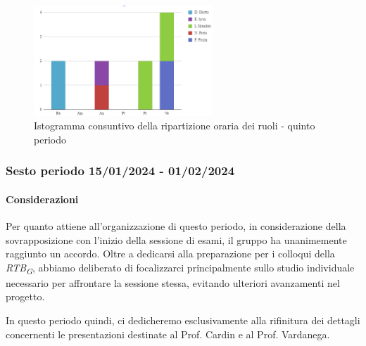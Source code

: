 \begin{figure}[H]
    \centering
    \includegraphics[width=0.6\textwidth]{../Images/consuntivoDivisioneRuoli5Periodo.png}
    \caption{Istogramma consuntivo della ripartizione oraria dei ruoli - quinto periodo}
    \label{fig:Consuntivo_ripartizione_oraria_5}
\end{figure}


\subsubsection{Sesto periodo  15/01/2024 - 01/02/2024}
\paragraph{Considerazioni}
Per quanto attiene all'organizzazione di questo periodo, in considerazione della sovrapposizione con l'inizio della sessione di esami, il gruppo ha unanimemente raggiunto un accordo. Oltre a dedicarsi alla preparazione per i colloqui della \textit{RTB}\textsubscript{\textit{G}}, abbiamo deliberato di focalizzarci principalmente sullo studio individuale necessario per affrontare la sessione stessa, evitando ulteriori avanzamenti nel progetto.

In questo periodo quindi, ci dedicheremo esclusivamente alla rifinitura dei dettagli concernenti le presentazioni destinate al Prof. Cardin e al Prof. Vardanega.

